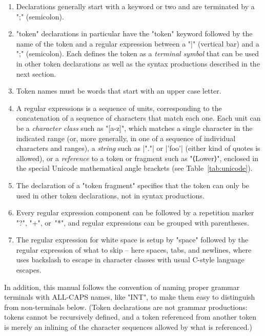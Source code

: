 \documentclass[12pt]{article} %
\begin{document}
\begin{notation}\leavevmode
  \begin{enumerate}

  \item Declarations generally start with a keyword or two and are terminated by a ";" (semicolon).

  \item "token" declarations in particular have the "token" keyword followed by the name of the
    token and a regular expression between a "|" (vertical bar) and a ";" (semicolon). Each defines
    the token as a \emph{terminal symbol} that can be used in other token declarations as well as
    the syntax productions described in the next section.

  \item Token names must be words that start with an upper case letter.

  \item A regular expressions is a sequence of units, corresponding to the concatenation of a
    sequence of characters that match each one.  Each unit can be a \emph{character class} such as
    "[a-z]", which matches a single character in the indicated range (or, more generally, in one of
    a sequence of individual characters and ranges), a \emph{string} such as \hacsc|"."| or
    \hacsc|'foo'| (either kind of quotes is allowed), or a \emph{reference} to a token or fragment
    such as "⟨Lower⟩", enclosed in the special Unicode mathematical angle brackets (see
    Table~\ref{tab:unicode}).

  \item The declaration of a "token fragment" specifies that the token can only be used in other
    token declarations, not in syntax productions.

  \item Every regular expression component can be followed by a repetition marker "?", "+", or~"*",
    and regular expressions can be grouped with parentheses.

  \item The regular expression for white space is setup by "space" followed by the regular
    expression of what to skip -- here spaces, tabs, and newlines, where \HAX uses backslash to
    escape in character classes with usual C-style language escapes.

  \end{enumerate}
  In addition, this manual follows the convention of naming proper grammar terminals with ALL-CAPS
  names, like "INT", to make them easy to distinguish from non-terminals below. (Token declarations
  are not grammar productions: tokens cannot be recursively defined, and a token referenced from
  another token is merely an inlining of the character sequences allowed by what is referenced.)
\end{notation}
\end{document}
